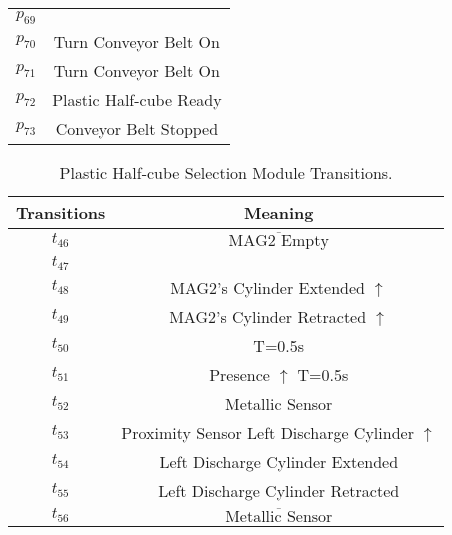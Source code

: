 \begin{table}[htbp]
\begin{tabular}{cc}
\hyperlink{partialNet:p69}{\hypertarget{partialTable:p69}{$p_{69}$}} & \\
\hyperlink{partialNet:p70}{\hypertarget{partialTable:p70}{$p_{70}$}} & Turn Conveyor Belt On\\
\hyperlink{partialNet:p71}{\hypertarget{partialTable:p71}{$p_{71}$}} & Turn Conveyor Belt On\\
\hyperlink{partialNet:p72}{\hypertarget{partialTable:p72}{$p_{72}$}} & Plastic Half-cube Ready\\
\hyperlink{partialNet:p73}{\hypertarget{partialTable:p73}{$p_{73}$}} & Conveyor Belt Stopped\\
\end{tabular}
\end{table}

\begin{table}[htbp]
\caption{Plastic Half-cube Selection Module Transitions.}
\centering
\begin{tabular}{cc}
Transitions & Meaning\\
\hline
\hyperlink{partialNet:t46}{\hypertarget{partialTable:t46}{$t_{46}$}} & \(\overline{\mbox{MAG2 Empty}}\)\\
\hyperlink{partialNet:t47}{\hypertarget{partialTable:t47}{$t_{47}$}} & \\
\hyperlink{partialNet:t48}{\hypertarget{partialTable:t48}{$t_{48}$}} & MAG2's Cylinder Extended \(\uparrow\)\\
\hyperlink{partialNet:t49}{\hypertarget{partialTable:t49}{$t_{49}$}} & MAG2's Cylinder Retracted \(\uparrow\)\\
\hyperlink{partialNet:tt50}{\hypertarget{partialTable:tt50}{$t_{50}$}} & T=0.5s\\
\hyperlink{partialNet:tt51}{\hypertarget{partialTable:tt51}{$t_{51}$}} & Presence \(\uparrow\) T=0.5s\\
\hyperlink{partialNet:t52}{\hypertarget{partialTable:t52}{$t_{52}$}} & Metallic Sensor\\
\hyperlink{partialNet:t53}{\hypertarget{partialTable:t53}{$t_{53}$}} & Proximity Sensor Left Discharge Cylinder \(\uparrow\)\\
\hyperlink{partialNet:t54}{\hypertarget{partialTable:t54}{$t_{54}$}} & Left Discharge Cylinder Extended\\
\hyperlink{partialNet:t55}{\hypertarget{partialTable:t55}{$t_{55}$}} & Left Discharge Cylinder Retracted\\
\hyperlink{partialNet:t56}{\hypertarget{partialTable:t56}{$t_{56}$}} & \(\overline{\mbox{Metallic Sensor}}\)\\

\end{tabular}
\end{table}
